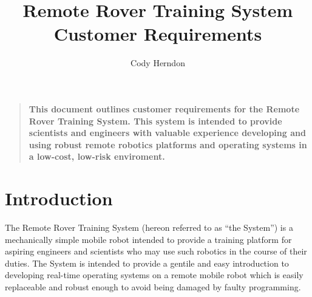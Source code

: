 \documentclass[12pt]{article}
\title{Remote Rover Training System\\Customer Requirements}
\author{Cody Herndon}
\date{}
\newenvironment{sciabstract}{%
\begin{quote} \bf}
{\end{quote}}
\begin{document}
 


\baselineskip24pt


\maketitle 




\begin{sciabstract}
  This document outlines customer requirements for the Remote Rover Training System.  This system is intended to provide scientists and engineers with valuable experience developing and using robust remote robotics platforms and operating systems in a low-cost, low-risk enviroment.
\end{sciabstract}




\section{Introduction}
The Remote Rover Training System (hereon referred to as ``the System'') is a mechanically simple mobile robot intended to provide a training platform for aspiring engineers and scientists who may use such robotics in the course of their duties.  The System is intended to provide a gentile and easy introduction to developing real-time operating systems on a remote mobile robot which is easily replaceable and robust enough to avoid being damaged by faulty programming.
\end{document}
